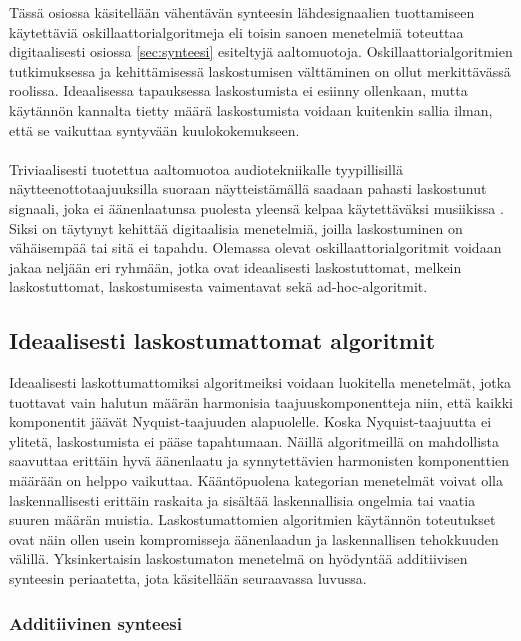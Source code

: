 \documentclass[finnish,12pt,a4paper,pdftex]{article} %
\begin{document}
Tässä osiossa käsitellään vähentävän synteesin lähdesignaalien tuottamiseen käytettäviä oskillaattorialgoritmeja eli toisin sanoen menetelmiä toteuttaa digitaalisesti osiossa \ref{sec:synteesi} esiteltyjä aaltomuotoja. Oskillaattorialgoritmien tutkimuksessa ja kehittämisessä laskostumisen välttäminen on ollut merkittävässä roolissa. Ideaalisessa tapauksessa laskostumista ei esiinny ollenkaan, mutta käytännön kannalta tietty määrä laskostumista voidaan kuitenkin sallia ilman, että se vaikuttaa syntyvään kuulokokemukseen. \\\\
Triviaalisesti tuotettua aaltomuotoa audiotekniikalle tyypillisillä näytteenottotaajuuksilla suoraan näytteistämällä saadaan pahasti laskostunut signaali, joka ei äänenlaatunsa puolesta yleensä kelpaa käytettäväksi musiikissa \cite{Nostalgia}. Siksi on täytynyt kehittää digitaalisia menetelmiä, joilla laskostuminen on vähäisempää tai sitä ei tapahdu. Olemassa olevat oskillaattorialgoritmit voidaan jakaa neljään eri ryhmään, jotka ovat ideaalisesti laskostuttomat, melkein laskostuttomat, laskostumisesta vaimentavat sekä ad-hoc-algoritmit. \cite{Pekonen2014, Historia}

\subsection{Ideaalisesti laskostumattomat algoritmit}

Ideaalisesti laskottumattomiksi algoritmeiksi voidaan luokitella menetelmät, jotka tuottavat vain halutun määrän harmonisia taajuuskomponentteja niin, että kaikki komponentit jäävät Nyquist-taajuuden alapuolelle. Koska Nyquist-taajuutta ei ylitetä, laskostumista ei pääse tapahtumaan. Näillä algoritmeillä on mahdollista saavuttaa erittäin hyvä äänenlaatu ja synnytettävien harmonisten komponenttien määrään on helppo vaikuttaa. Kääntöpuolena kategorian menetelmät voivat olla laskennallisesti erittäin raskaita ja sisältää laskennallisia ongelmia tai vaatia suuren määrän muistia. Laskostumattomien algoritmien käytännön toteutukset ovat näin ollen usein kompromisseja äänenlaadun ja laskennallisen tehokkuuden välillä. Yksinkertaisin laskostumaton menetelmä on hyödyntää additiivisen synteesin periaatetta, jota käsitellään seuraavassa luvussa. \cite{Pekonen2014, Historia}

\subsubsection{Additiivinen synteesi} \label{sec:additiivinen}
\end{document}
